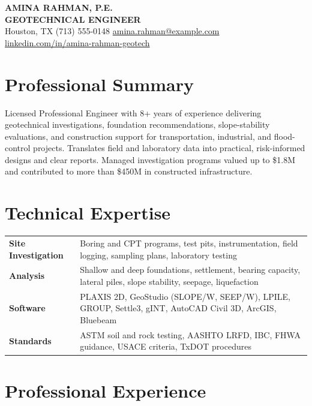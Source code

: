\documentclass[10pt,letterpaper]{article}
\begin{document}
\begin{center}
  {\fontsize{22}{24}\selectfont\bfseries\color{accent} AMINA RAHMAN, P.E.}\\[0.2em]
  {\large\bfseries GEOTECHNICAL ENGINEER}\\[0.35em]
  Houston, TX \enspace\textbar\enspace
  (713) 555-0148 \enspace\textbar\enspace
  \href{mailto:amina.rahman@example.com}{amina.rahman@example.com} \enspace\textbar\enspace
  \href{https://www.linkedin.com/in/amina-rahman-geotech}{linkedin.com/in/amina-rahman-geotech}
\end{center}
\vspace{-0.35em}

\section*{Professional Summary}
Licensed Professional Engineer with 8+ years of experience delivering geotechnical investigations, foundation recommendations, slope-stability evaluations, and construction support for transportation, industrial, and flood-control projects. Translates field and laboratory data into practical, risk-informed designs and clear reports. Managed investigation programs valued up to \$1.8M and contributed to more than \$450M in constructed infrastructure.

\section*{Technical Expertise}
\begin{tabularx}{\textwidth}{@{}>{\bfseries}p{1.35in}X@{}}
  Site Investigation & Boring and CPT programs, test pits, instrumentation, field logging, sampling plans, laboratory testing\\
  Analysis & Shallow and deep foundations, settlement, bearing capacity, lateral piles, slope stability, seepage, liquefaction\\
  Software & PLAXIS 2D, GeoStudio (SLOPE/W, SEEP/W), LPILE, GROUP, Settle3, gINT, AutoCAD Civil 3D, ArcGIS, Bluebeam\\
  Standards & ASTM soil and rock testing, AASHTO LRFD, IBC, FHWA guidance, USACE criteria, TxDOT procedures\\
\end{tabularx}

\section*{Professional Experience}
\end{document}
